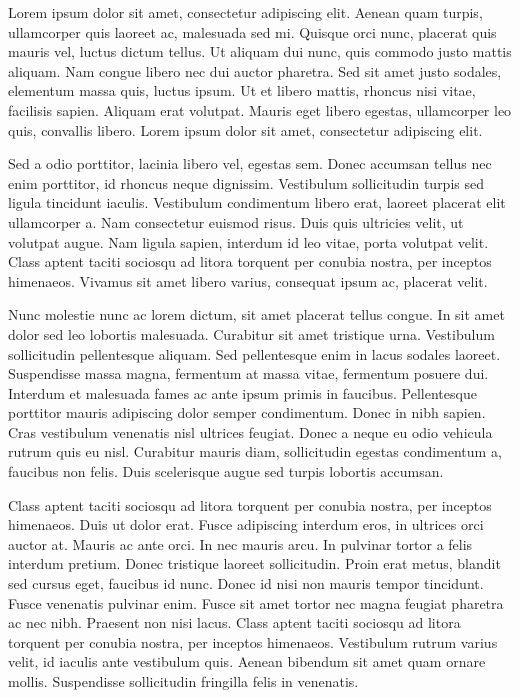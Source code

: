 \documentclass[rascunho,xindy]{fei}
\begin{document}
\begin{resumo}
Lorem ipsum dolor sit amet, consectetur adipiscing elit. Aenean quam turpis, ullamcorper quis laoreet ac, malesuada sed mi. Quisque orci nunc, placerat quis mauris vel, luctus dictum tellus. Ut aliquam dui nunc, quis commodo justo mattis aliquam. Nam congue libero nec dui auctor pharetra. Sed sit amet justo sodales, elementum massa quis, luctus ipsum. Ut et libero mattis, rhoncus nisi vitae, facilisis sapien. Aliquam erat volutpat. Mauris eget libero egestas, ullamcorper leo quis, convallis libero. Lorem ipsum dolor sit amet, consectetur adipiscing elit.

Sed a odio porttitor, lacinia libero vel, egestas sem. Donec accumsan tellus nec enim porttitor, id rhoncus neque dignissim. Vestibulum sollicitudin turpis sed ligula tincidunt iaculis. Vestibulum condimentum libero erat, laoreet placerat elit ullamcorper a. Nam consectetur euismod risus. Duis quis ultricies velit, ut volutpat augue. Nam ligula sapien, interdum id leo vitae, porta volutpat velit. Class aptent taciti sociosqu ad litora torquent per conubia nostra, per inceptos himenaeos. Vivamus sit amet libero varius, consequat ipsum ac, placerat velit.

Nunc molestie nunc ac lorem dictum, sit amet placerat tellus congue. In sit amet dolor sed leo lobortis malesuada. Curabitur sit amet tristique urna. Vestibulum sollicitudin pellentesque aliquam. Sed pellentesque enim in lacus sodales laoreet. Suspendisse massa magna, fermentum at massa vitae, fermentum posuere dui. Interdum et malesuada fames ac ante ipsum primis in faucibus. Pellentesque porttitor mauris adipiscing dolor semper condimentum. Donec in nibh sapien. Cras vestibulum venenatis nisl ultrices feugiat. Donec a neque eu odio vehicula rutrum quis eu nisl. Curabitur mauris diam, sollicitudin egestas condimentum a, faucibus non felis. Duis scelerisque augue sed turpis lobortis accumsan.

Class aptent taciti sociosqu ad litora torquent per conubia nostra, per inceptos himenaeos. Duis ut dolor erat. Fusce adipiscing interdum eros, in ultrices orci auctor at. Mauris ac ante orci. In nec mauris arcu. In pulvinar tortor a felis interdum pretium. Donec tristique laoreet sollicitudin. Proin erat metus, blandit sed cursus eget, faucibus id nunc. Donec id nisi non mauris tempor tincidunt. Fusce venenatis pulvinar enim. Fusce sit amet tortor nec magna feugiat pharetra ac nec nibh. Praesent non nisi lacus. Class aptent taciti sociosqu ad litora torquent per conubia nostra, per inceptos himenaeos. Vestibulum rutrum varius velit, id iaculis ante vestibulum quis. Aenean bibendum sit amet quam ornare mollis. Suspendisse sollicitudin fringilla felis in venenatis.


\end{resumo}
\end{document}
